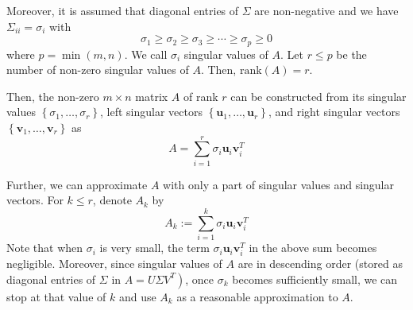 \documentclass[10pt]{article}
\begin{document}
Moreover, it is assumed that diagonal entries of $\Sigma$ are non-negative and we have $\Sigma_{i i}=\sigma_{i}$ with
$$
\sigma_{1} \geq \sigma_{2} \geq \sigma_{3} \geq \cdots \geq \sigma_{p} \geq 0
$$
where $p=\min (m, n)$. 
We call $\sigma_{i}$ singular values of $A$. 
Let $r \leq p$ be the number of non-zero singular values of $A$. 
Then, $\text{rank}(A) = r$.

Then, the non-zero $m \times n$ matrix $A$ of rank $r$ can be constructed from its singular values $\left\{\sigma_{1}, \ldots, \sigma_{r}\right\}$, left singular vectors $\left\{\mathbf{u}_{1}, \ldots, \mathbf{u}_{r}\right\}$, and right singular vectors $\left\{\mathbf{v}_{1}, \ldots, \mathbf{v}_{r}\right\}$ as
$$
A=\sum_{i=1}^{r} \sigma_{i} \mathbf{u}_{i} \mathbf{v}_{i}^{T}
$$

Further, we can approximate $A$ with only a part of singular values and singular vectors. For $k \leq r$, denote $A_{k}$ by
$$
A_{k}:=\sum_{i=1}^{k} \sigma_{i} \mathbf{u}_{i} \mathbf{v}_{i}^{T}
$$
Note that when $\sigma_{i}$ is very small, the term $\sigma_{i} \mathbf{u}_{i} \mathbf{v}_{i}^{T}$ in the above sum becomes negligible. Moreover, since singular values of $A$ are in descending order (stored as diagonal entries of $\Sigma$ in $\left.A=U \Sigma V^{T}\right)$, once $\sigma_{k}$ becomes sufficiently small, we can stop at that value of $k$ and use $A_{k}$ as a reasonable approximation to $A$. 
\end{document}
